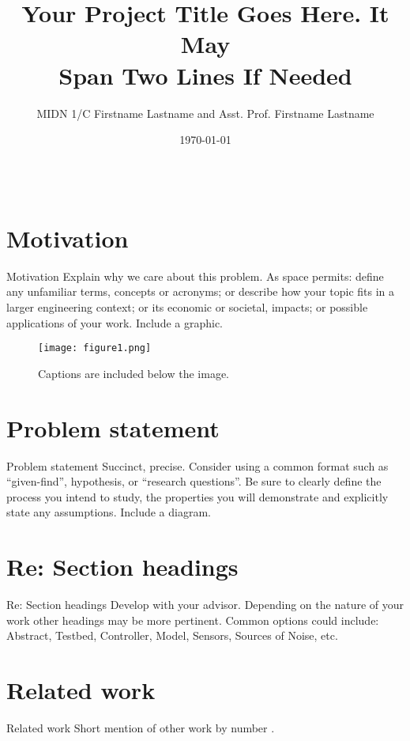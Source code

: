 \documentclass[pdf]{beamer}
\title{\huge Your Project Title Goes Here. It May\\Span Two Lines If Needed}
\author{MIDN 1/C Firstname Lastname and Asst. Prof. Firstname Lastname}
\institute[WRCE]{$^{1}$Weapons, Robotics, and Control Engineering, United States Naval Academy}
\date{\today}
\begin{document}
\begin{frame}[fragile]
\begin{columns}

\begin{column}{0.25\textwidth}
\begin{minipage}[t][\textheight]{\linewidth}
\section{Motivation}
\begin{block}{Motivation}\small
Explain why we care about this problem.  As space permits: define any unfamiliar terms, concepts or acronyms; or describe how your topic fits in a larger engineering context; or its economic or societal, impacts; or possible applications of your work.  Include a graphic.

\begin{figure}
\texttt{[image: figure1.png]}
\caption{Captions are included below the image.}
\end{figure}
\end{block}
\vfill

\section{Problem statement}
\begin{block}{Problem statement}\small
Succinct, precise. Consider using a common format such as ``given-find'', hypothesis, or ``research questions''. Be sure to clearly define the process you intend to study, the properties you will demonstrate and explicitly state any assumptions.  Include a diagram. 
\end{block}
\vfill

\section{Re: Section headings}
\begin{block}{Re: Section headings}\small
Develop with your advisor. Depending on the nature of your work other headings may be more pertinent. Common options could include: Abstract, Testbed, Controller, Model, Sensors, Sources of Noise, etc.
\end{block}
\vfill


\section{Related work}
\begin{block}{Related work}\small
Short mention of other work by number \cite{chen1993linear,chen1965automatic}. %
\end{block}
\end{minipage}
\end{column}






\end{columns}
\end{frame}
\end{document}
